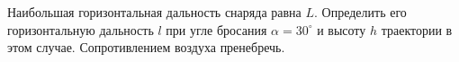 Наибольшая горизонтальная дальность снаряда равна $L$. Определить его горизонтальную дальность $l$ при угле бросания
$\alpha=30^\circ$ и высоту $h$ траектории в этом случае. Сопротивлением воздуха пренебречь.
